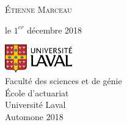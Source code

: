 \begin{titlepage}
		{\scshape\Large Étienne Marceau \\} %
		
		\vspace*{3\baselineskip}
		
		le $1^{er}$ décembre 2018
		
		\vspace{0.5\baselineskip} %
		
		\vfill %
		
		
		\includegraphics[height=1.2cm]{UL_P.pdf}\\
		
		Faculté des sciences et de génie\\
		École d'actuariat\\
		Université Laval\\
		Automone 2018       
	\end{titlepage}